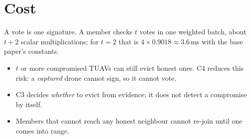 \section{Cost}
A vote is one signature. A member checks $t$ votes in one weighted batch, about $t+2$ scalar multiplications; for $t=2$ that is $4\times0.9018\approx3.6$\,ms
with the base paper's constants.

\begin{limitbox}
\begin{itemize}[leftmargin=*]
\item $t$ or more compromised TUAVs can still evict honest ones. C4 reduces this risk: a \emph{captured} drone cannot sign, so it cannot vote.
\item C3 decides \emph{whether} to evict from evidence; it does not detect a compromise by itself.
\item Members that cannot reach any honest neighbour cannot re-join until one comes into range.
\end{itemize}
\end{limitbox}
